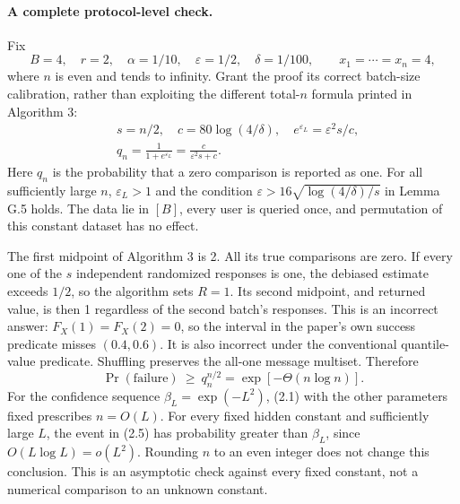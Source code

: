 \documentclass[10pt]{article}
\begin{document}
\paragraph*{A complete protocol-level check.}\mbox{}\par
Fix \[B=4,\quad r=2,\quad \alpha=1/10,\quad
 \varepsilon=1/2,\quad \delta=1/100,
 \qquad x_1=\cdots=x_n=4,\] where \(n\) is even and tends to infinity. Grant the proof its correct batch-size calibration, rather than exploiting the different total-\(n\) formula printed in Algorithm 3: \[\begin{aligned}
&s=n/2,\quad c=80\log(4/\delta),\quad
 e^{\varepsilon_L}=\varepsilon^2s/c,\\
&q_n=\frac{1}{1+e^{\varepsilon_L}}
     =\frac{c}{\varepsilon^2s+c}.
\end{aligned}\] Here \(q_n\) is the probability that a zero comparison is reported as one. For all sufficiently large \(n\), \(\varepsilon_L>1\) and the condition \(\varepsilon>16\sqrt{\log(4/\delta)/s}\) in Lemma G.5 holds. The data lie in \([B]\), every user is queried once, and permutation of this constant dataset has no effect.\par
The first midpoint of Algorithm 3 is 2. All its true comparisons are zero. If every one of the \(s\) independent randomized responses is one, the debiased estimate exceeds \(1/2\), so the algorithm sets \(R=1\). Its second midpoint, and returned value, is then 1 regardless of the second batch’s responses. This is an incorrect answer: \(F_X(1)=F_X(2)=0\), so the interval in the paper’s own success predicate misses \((0.4,0.6)\). It is also incorrect under the conventional quantile-value predicate. Shuffling preserves the all-one message multiset. Therefore \[\Pr(\text{failure})\ \geq\ q_n^{n/2}
 =\exp[-\Theta(n\log n)].\] For the confidence sequence \(\beta_L=\exp(-L^2)\), (2.1) with the other parameters fixed prescribes \(n=O(L)\). For every fixed hidden constant and sufficiently large \(L\), the event in (2.5) has probability greater than \(\beta_L\), since \(O(L\log L)=o(L^2)\). Rounding \(n\) to an even integer does not change this conclusion. This is an asymptotic check against every fixed constant, not a numerical comparison to an unknown constant.\par
\end{document}
